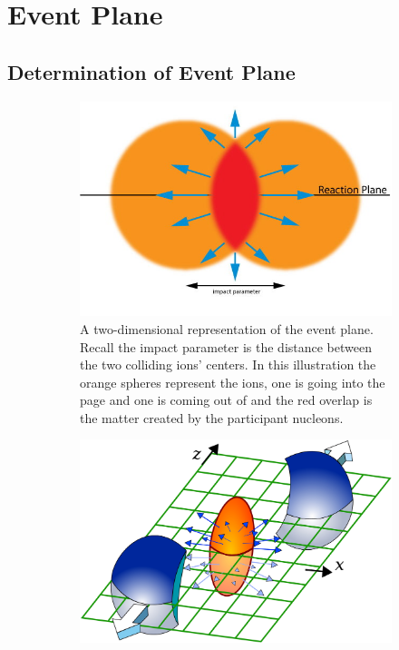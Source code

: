 
\chapter{Event Plane} %

\section{Determination of Event Plane}
\label{sect:eventplane}

\begin{figure}[htbp!]
  \centering
    \begin{subfigure}[p]{0.6\textwidth}
    \includegraphics[width=1\textwidth]{Figures/Flow_Plane.jpg}
    \caption[Diagram showing impact parameter versus $N_spectators$ and $N_participants$]{A two-dimensional representation of the event plane. Recall the impact parameter is the distance between the two colliding ions' centers. In this illustration the orange spheres represent the ions, one is going into the page and one is coming out of and the red overlap is the matter created by the participant nucleons.
    \label{fig:cernfireball}}
    \end{subfigure}
    \begin{subfigure}[p]{0.55\textwidth}
    \includegraphics[width=1\textwidth]{Figures/flowcartoon.jpg}

\end{subfigure}
\end{figure}
